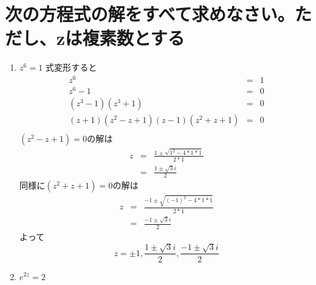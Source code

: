 \documentclass{jsarticle}
\begin{document}
\section{次の方程式の解をすべて求めなさい。ただし、zは複素数とする}
\begin{enumerate}[(1)]
  \item $z^6=1$
    式変形すると
    \begin{eqnarray*}
      z^6&=&1\\
      z^6-1&=&0\\
      (z^3-1)(z^3+1)&=&0\\
      (z+1)(z^2-z+1)(z-1)(z^2+z+1)&=&0\\
    \end{eqnarray*}
    $(z^2-z+1)=0$の解は
    \begin{eqnarray*}
      z&=&\frac{1\pm\sqrt{1^2-4*1*1}}{2*1}\\
      &=&\frac{1\pm\sqrt{3}i}{2}
    \end{eqnarray*}
    同様に$(z^2+z+1)=0$の解は
    \begin{eqnarray*}
      z&=&\frac{-1\pm\sqrt{(-1)^2-4*1*1}}{2*1}\\
      &=&\frac{-1\pm\sqrt{3}i}{2}
    \end{eqnarray*}
    よって
    \[
    z=\pm1,\frac{1\pm\sqrt{3}i}{2},\frac{-1\pm\sqrt{3}i}{2}
    \]
  \item $e^{2z}=2$
    
\end{enumerate}
\end{document}

